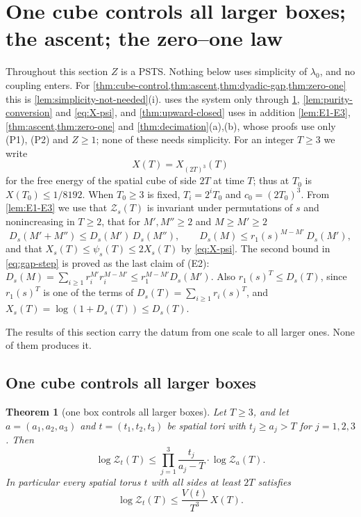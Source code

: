 \documentclass[11pt,a4paper]{amsart}
\newtheorem{theorem}{Theorem}[section]
\theoremstyle{definition}
\theoremstyle{remark}
\numberwithin{equation}{section}
\newcommand{\PSTS}{\textup{PSTS}}          %
\newcommand{\TT}{\mathbb{T}}               %
\newcommand{\Zc}{\mathcal{Z}}              %
\newcommand{\Zs}[2]{\Zc_{#1}(#2)}          %
\newcommand{\XT}[2]{X_{#1}(#2)}            %
\newcommand{\Dexc}[2]{D_{#1}(#2)}          %
\newcommand{\psiT}[2]{\psi_{#1}(#2)}       %
\newcommand{\Vol}[1]{V(#1)}                %
\newcommand{\cube}[1]{(2#1)^3}             %
\newcommand{\lzero}{\lambda_0}             %
\newcommand{\xconst}{\frac{1}{8192}}       %
\newcommand{\xconstinl}{1/8192}            %
\newcommand{\Bcirc}{\text{\upshape(B$^{\circ}$)}}   %
\begin{document}
\section{One cube controls all larger boxes; the ascent; the zero--one law}\label{sec:ascent}

Throughout this section $Z$ is a \PSTS{}. Nothing below uses simplicity of $\lzero$, and no coupling enters. For \cref{thm:cube-control,thm:ascent,thm:dyadic-gap,thm:zero-one} this is \cref{lem:simplicity-not-needed}(i).  uses the system only through \cref{thm:cube-control}, \cref{lem:purity-conversion} and \eqref{eq:X-psi}, and \cref{thm:upward-closed} uses in addition \cref{lem:E1-E3}, \cref{thm:ascent,thm:zero-one} and \cref{thm:decimation}(a),(b), whose proofs use only (P1), (P2) and $Z\ge1$; none of these needs simplicity. For an integer $T\ge3$ we write
\[
X(T)=\XT{\cube{T}}{T}
\]
for the free energy of the spatial cube of side $2T$ at time $T$; thus \Bcirc{} at $T_0$ is $X(T_0)\le\xconstinl$. When $T_0\ge3$ is fixed, $T_i=2^iT_0$ and $c_0=\cube{T_0}$. From \cref{lem:E1-E3} we use that $\Zs{s}{T}$ is invariant under permutations of $s$ and nonincreasing in $T\ge2$, that for $M',M''\ge2$ and $M\ge M'\ge2$
\begin{equation}\label{eq:gap-step}
\Dexc{s}{M'+M''}\le\Dexc{s}{M'}\,\Dexc{s}{M''},\qquad \Dexc{s}{M}\le r_1(s)^{M-M'}\,\Dexc{s}{M'},
\end{equation}
and that $\XT{s}{T}\le\psiT{s}{T}\le2\XT{s}{T}$ by \eqref{eq:X-psi}. The second bound in \eqref{eq:gap-step} is proved as the last claim of (E2): $\Dexc{s}{M}=\sum_{i\ge1}r_i^{M'}r_i^{M-M'}\le r_1^{M-M'}\Dexc{s}{M'}$. Also $r_1(s)^T\le\Dexc{s}{T}$, since $r_1(s)^T$ is one of the terms of $\Dexc{s}{T}=\sum_{i\ge1}r_i(s)^T$, and $\XT{s}{T}=\log(1+\Dexc{s}{T})\le\Dexc{s}{T}$.

The results of this section carry the datum from one scale to all larger ones. None of them produces it.

\subsection{One cube controls all larger boxes}

\begin{theorem}[one box controls all larger boxes]\label{thm:cube-control}
Let $T\ge3$, and let $a=(a_1,a_2,a_3)$ and $t=(t_1,t_2,t_3)$ be spatial tori with $t_j\ge a_j>T$ for $j=1,2,3$. Then
\begin{equation}\label{eq:box-control}
\log\Zs{t}{T}\le\prod_{j=1}^3\frac{t_j}{a_j-T}\cdot\log\Zs{a}{T}.
\end{equation}
In particular every spatial torus $t$ with all sides at least $2T$ satisfies
\begin{equation}\label{eq:cube-control}
\log\Zs{t}{T}\le\frac{\Vol{t}}{T^3}\,X(T).
\end{equation}
\end{theorem}
\end{document}
